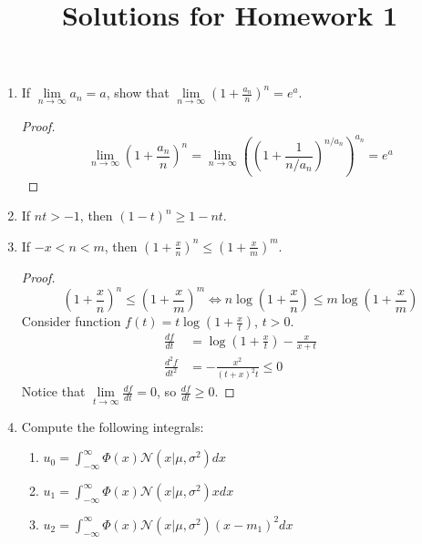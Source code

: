 \documentclass[10pt,a4paper]{article}
\title{Solutions for Homework 1}
\date{}
\def\MN{{\mathcal N}}
\begin{document}
\maketitle
\begin{enumerate}
\item
If $\lim \limits_{n\rightarrow\infty}a_n=a$, show that $\lim \limits_{n\rightarrow\infty}\left(1+\frac{a_n}{n}\right)^n=e^{a}$.
\begin{proof}
$$\lim \limits_{n\rightarrow\infty}\left(1+\frac{a_n}{n}\right)^n  = \lim \limits_{n\rightarrow\infty}\left(\left(1+\frac{1}{n/a_n}\right)^{n/a_n}\right)^{a_n} = e^a$$
\end{proof}

\item If $nt>-1$, then $(1-t)^n\ge 1-nt$.


\item If $-x<n<m$, then $(1+\frac{x}{n})^n\le (1+\frac{x}{m})^m$.
\begin{proof}
$$(1+\frac{x}{n})^n\le (1+\frac{x}{m})^m \Longleftrightarrow n\log(1+\frac{x}{n})\le m\log(1+\frac{x}{m})$$
Consider function $f(t)=t\log(1+\frac{x}{t})$, $t>0$. 
\begin{equation}
\begin{aligned}
\frac{df}{dt}&=\log(1+\frac{x}{t})-\frac{x}{x+t} \\
\frac{d^2f}{dt^2}&=-\frac{x^2}{(t+x)^2t}\le 0
\end{aligned}
\end{equation}
Notice that $\lim \limits_{t\rightarrow\infty}\frac{df}{dt}=0$, so $\frac{df}{dt}\ge 0$.
\end{proof}

\item Compute the following integrals:
\begin{enumerate}
\item $u_0 = \int_{-\infty}^{\infty} \Phi(x) \MN(x|\mu, \sigma^2) dx$
\item $u_1 = \int_{-\infty}^{\infty} \Phi(x) \MN(x|\mu, \sigma^2)x dx$
\item $u_2 = \int_{-\infty}^{\infty} \Phi(x) \MN(x|\mu, \sigma^2)(x-m_1)^2 dx$


\end{enumerate}
\end{enumerate}
\end{document}

